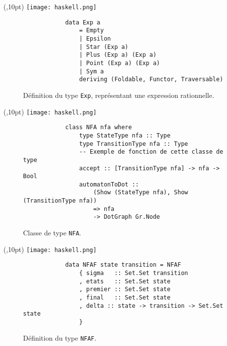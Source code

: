 \documentclass[aspectratio=169,xcolor=dvipsnames]{beamer}
\begin{document}

\begin{frame}[fragile]
    \begin{textblock*}{20pt}(\textwidth-50pt,10pt)
        \texttt{[image: haskell.png]}
    \end{textblock*}
    \begin{figure}        
        \begin{verbatim}
            data Exp a
                = Empty
                | Epsilon
                | Star (Exp a)
                | Plus (Exp a) (Exp a)
                | Point (Exp a) (Exp a)
                | Sym a
                deriving (Foldable, Functor, Traversable)
        \end{verbatim}
        \caption{
            Définition du type \texttt{Exp}, représentant une 
            expression rationnelle.
        }
    \end{figure}
\end{frame}


\begin{frame}[fragile]
    \begin{textblock*}{20pt}(\textwidth-50pt,10pt)
        \texttt{[image: haskell.png]}
    \end{textblock*}
    \begin{figure}
        \begin{verbatim}
            class NFA nfa where
                type StateType nfa :: Type
                type TransitionType nfa :: Type
                -- Exemple de fonction de cette classe de type 
                accept :: [TransitionType nfa] -> nfa -> Bool
                automatonToDot ::
                    (Show (StateType nfa), Show (TransitionType nfa))
                    => nfa
                    -> DotGraph Gr.Node
        \end{verbatim}
        \caption{Classe de type \texttt{NFA}.}
    \end{figure}
\end{frame}


\begin{frame}[fragile]
    \begin{textblock*}{20pt}(\textwidth-50pt,10pt)
        \texttt{[image: haskell.png]}
    \end{textblock*}
    \begin{figure}
        \begin{verbatim}
            data NFAF state transition = NFAF
                { sigma   :: Set.Set transition
                , etats   :: Set.Set state
                , premier :: Set.Set state
                , final   :: Set.Set state
                , delta :: state -> transition -> Set.Set state
                }
        \end{verbatim}
        \caption{Définition du type \texttt{NFAF}.}
    \end{figure}
\end{frame}
\end{document}
